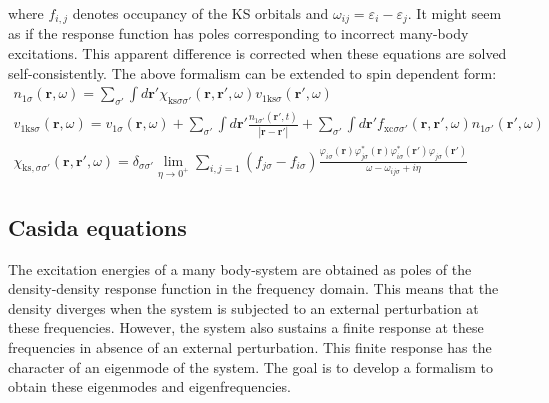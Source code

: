 where $f_{i,j}$ denotes occupancy of the KS orbitals and $\omega_{ij} = \varepsilon_i - \varepsilon_j$. It might seem as if the response function has poles corresponding to incorrect many-body excitations. This apparent difference is corrected when these equations are solved self-consistently. The above formalism can be extended to spin dependent form:
\begin{gather}
    n_{1\sigma}(\mathbf{r},\omega) = \sum_{\sigma'}\int d\mathbf{r'} \chi_{\text{ks}\sigma\sigma'}(\mathbf{r},\mathbf{r}',\omega)v_{1\text{ks}\sigma}(\mathbf{r}',\omega) \label{spind_linear_response}\\
    v_{1\text{ks}\sigma}(\mathbf{r},\omega) = v_{1\sigma}(\mathbf{r},\omega) + \sum_{\sigma'}\int d\mathbf{r}'\frac{n_{1\sigma'}(\mathbf{r}',t)}{|\mathbf{r}-\mathbf{r}'|} +   \sum_{\sigma'}\int d\mathbf{r}'f_{\text{xc}\sigma\sigma'}(\mathbf{r},\mathbf{r}',\omega)n_{1\sigma'}(\mathbf{r}',\omega) \label{spind_ks_perturbation} \\ 
    \chi_{\text{ks},\sigma\sigma'}(\mathbf{r},\mathbf{r}',\omega) = \delta_{\sigma\sigma'}\lim_{\eta \to 0^+} \sum_{i,j = 1}(f_{j\sigma} - f_{i\sigma})\frac{\varphi_{i\sigma}(\mathbf{r})\varphi_{j\sigma}^*(\mathbf{r})\varphi_{i\sigma}^*(\mathbf{r}')\varphi_{j\sigma}(\mathbf{r}')
    }{\omega - \omega_{ij\sigma} + i\eta} \label{spind_response_function}
\end{gather}
\subsection{Casida equations}
The excitation energies of a many body-system are obtained as poles of the density-density response function in the frequency domain. This means that the density diverges when the system is subjected to an external perturbation at these frequencies. However, the system also sustains a finite response at these frequencies in absence of an external perturbation. This finite response has the character of an eigenmode of the system. The goal is to develop a formalism to obtain these eigenmodes and eigenfrequencies. 

